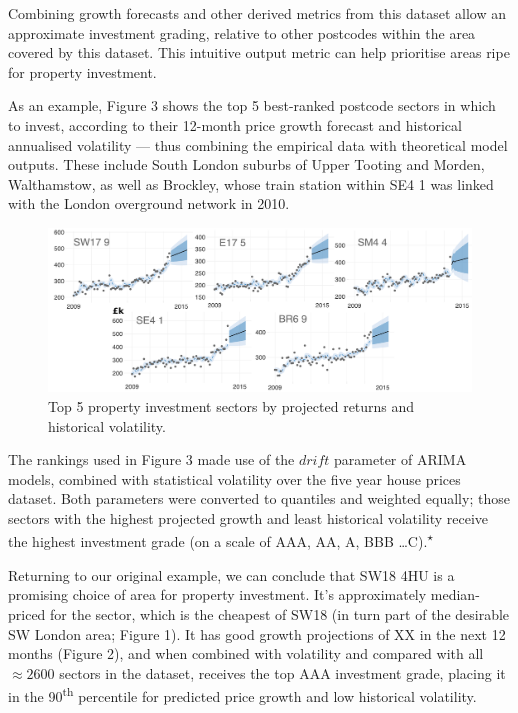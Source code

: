 \documentclass[
10pt, %
a4paper, %
oneside, %
headinclude,footinclude, %
BCOR5mm, %
]{scrartcl}
\begin{document}
Combining growth forecasts and other derived metrics from this
dataset allow an approximate investment grading, relative to other
postcodes within the area covered by this dataset. This intuitive
output metric can help prioritise areas ripe for property investment.

As an example, Figure 3 shows the top 5 best-ranked postcode sectors
in which to invest, according to their 12-month price growth forecast
and historical annualised volatility --- thus combining the empirical
data with theoretical model outputs. These include South London
suburbs of Upper Tooting and Morden, Walthamstow, as well as Brockley,
whose train station within SE4 1 was linked with the London overground network in 2010.\\

\begin{figure}[h]
\begin{center}
\includegraphics[width=.9\textwidth]{Figures/t5.pdf}
\caption{Top 5 property investment sectors by projected returns and historical volatility.}
\end{center}
\end{figure}

The rankings used in Figure 3 made use of the $drift$ parameter of
ARIMA models, combined with statistical volatility over the five year
house prices dataset. Both parameters were converted to quantiles and
weighted equally; those sectors with the highest projected growth
and least historical volatility receive the highest investment grade
(on a scale of AAA, AA, A, BBB \ldots C).\textsuperscript{$\star$}

Returning to our original example, we can conclude that SW18 4HU is a
promising choice of area for property investment. It's approximately
median-priced for the sector, which is the cheapest of SW18 (in turn
part of the desirable SW London area; Figure 1). It has good growth
projections of XX in the next 12 months (Figure 2), and when combined
with volatility and compared with all $\approx2600$ sectors in the
dataset, receives the top AAA investment grade, placing it in the
90\textsuperscript{th} percentile for predicted price growth and low
historical volatility.
\end{document}
